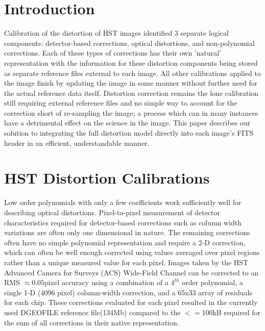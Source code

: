 \section{Introduction}
Calibration of the distortion of HST images identified 3 separate logical components: detector-based corrections, optical distortions, and non-polynomial corrections. Each of these types of corrections has their own 'natural' representation with the information for these distortion components being stored as separate reference files external to each image. All other calibrations applied to the image finish by updating the image in some manner without further need for the actual reference data itself. Distortion correction remains the lone calibration still requiring external reference files and no simple way to account for the correction short of re-sampling the image; a process which can in many instances have a detrimental effect on the science in the image. This paper describes our solution to integrating the full distortion model directly into each image's FITS header in an efficient, understandable manner.

\section{HST Distortion Calibrations}
Low order polynomials with only a few coefficients work sufficiently well for describing optical distortions. Pixel-to-pixel measurement of detector characteristics required for detector-based corrections such as column width variations are often only one dimensional in nature.  The remaining corrections often have no simple polynomial representation and require a 2-D correction, which can often be well enough corrected using values averaged over pixel regions rather than a unique measured value for each pixel. Images taken by the HST Advanced Camera for Surveys (ACS) Wide-Field Channel can be corrected to an RMS $\approx 0.05$pixel accuracy using a combination of a $4^{th}$ order polynomial, a single 1-D (4096 pixel) column-width correction, and a 65x33 array of residuals for each chip. These corrections evaluated for each pixel resulted in the currently used DGEOFILE reference file(134Mb) compared to the $<=$100kB required for the sum of all corrections in their native representation. 

